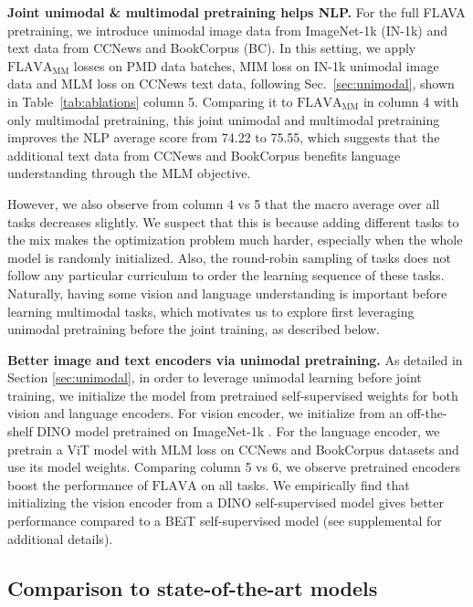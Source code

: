 \documentclass[10pt,twocolumn,letterpaper]{article}
\newcommand{\myparagraph}[1]{\vspace{0.25em}\noindent\textbf{#1}}
\begin{document}
\myparagraph{Joint unimodal \& multimodal pretraining helps NLP.} For the full FLAVA pretraining, we introduce unimodal image data from ImageNet-1k (IN-1k) and text data from CCNews and BookCorpus (BC). In this setting, we apply $\mathrm{FLAVA}_\mathrm{MM}$ losses on PMD data batches, MIM loss on IN-1k unimodal image data and MLM loss on CCNews text data, following Sec.~\ref{sec:unimodal}, shown in Table~\ref{tab:ablations} column 5. Comparing it to $\mathrm{FLAVA}_\mathrm{MM}$ in column 4 with only multimodal pretraining, this joint unimodal and multimodal pretraining improves the NLP average score from 74.22 to 75.55, which suggests that the additional text data from CCNews and BookCorpus benefits language understanding through the MLM objective.

However, we also observe from column 4 vs 5 that the macro average over all tasks decreases slightly. We suspect that this is because adding different tasks to the mix makes the optimization problem much harder, especially when the whole model is randomly initialized. Also, the round-robin sampling of tasks does not follow any particular curriculum to order the learning sequence of these tasks. Naturally, having some vision and language understanding is important before learning multimodal tasks, which motivates us to explore first leveraging unimodal pretraining before the joint training, as described below.

\myparagraph{Better image and text encoders via unimodal pretraining.} As detailed in Section \ref{sec:unimodal}, in order to leverage unimodal learning before joint training, we initialize the model from pretrained self-supervised weights for both vision and language encoders. For vision encoder, we initialize from an off-the-shelf DINO model pretrained on ImageNet-1k \cite{imagenet}. For the language encoder, we pretrain a ViT model with MLM loss on CCNews and BookCorpus datasets and use its model weights. Comparing column 5 vs 6, we observe pretrained encoders boost the performance of $\mathrm{FLAVA}$ on all tasks. We empirically find that initializing the vision encoder from a DINO self-supervised model gives better performance compared to a BEiT self-supervised model (see supplemental for additional details).

\subsection{Comparison to state-of-the-art models}
\label{sec:compare_sota}
\end{document}
